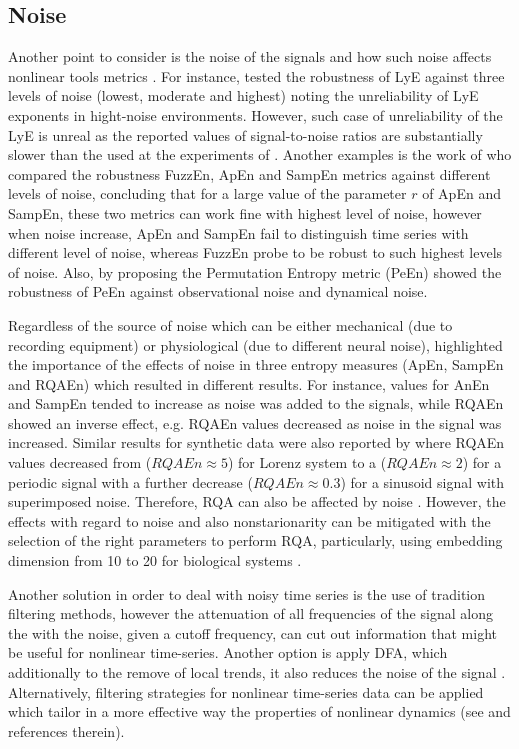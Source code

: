 \subsection{Noise}
Another point to consider is the noise of the signals
and how such noise affects nonlinear tools metrics \citep{caballero2014}.
For instance, \cite{rosenstein1993} tested the robustness of LyE against 
three levels of noise (lowest, moderate and highest) noting the unreliability 
of LyE exponents in hight-noise environments.
However, such case of unreliability of the LyE is unreal as the reported 
values of signal-to-noise ratios are substantially slower than the used at 
the experiments of \cite{rosenstein1993}.
Another examples is the work of \cite{chen2009} who compared the 
robustness FuzzEn, ApEn and SampEn metrics against different levels of noise, 
concluding that for a large value of the parameter $r$ of ApEn and SampEn, 
these two metrics can work fine with highest level of noise, however
when noise increase, ApEn and SampEn fail to distinguish time series with 
different level of noise, whereas FuzzEn probe to be robust to such highest 
levels of noise.
Also, \cite{bandt2002} by proposing the Permutation Entropy metric (PeEn)
showed the robustness of PeEn against observational noise and dynamical noise.


Regardless of the source of noise which can be either mechanical 
(due to recording equipment) or physiological (due to different neural noise), 
\cite{rhea2011} highlighted the importance of the effects of noise in three 
entropy measures (ApEn, SampEn and RQAEn) which resulted in different results.
For instance, values for AnEn and SampEn tended to increase as noise was 
added to the signals, while RQAEn  showed an inverse effect, e.g. RQAEn 
values decreased as noise in the signal was increased.
Similar results for synthetic data were also reported by \cite{pellecchia2005} 
where RQAEn values decreased from ($RQAEn \approx 5$) for Lorenz system to a 
($RQAEn \approx 2$) for a periodic signal with a further decrease 
($RQAEn \approx 0.3$) for a sinusoid signal with superimposed noise. 
Therefore, RQA can also be affected by noise \citep{rhea2011}.
However, the effects with regard to noise and also nonstarionarity
can be mitigated with the selection of the right parameters to perform RQA,
particularly, using embedding dimension from 10 to 20 for biological systems 
\citep{webber2005}.

Another solution in order to deal with noisy time series is the use of 
tradition filtering methods, however the attenuation of all frequencies 
of the signal along the with the noise, given a cutoff frequency, can cut 
out information that might be useful for nonlinear time-series. 
Another option is apply DFA, which additionally to the remove of local 
trends, it also reduces the noise of the signal \citep{hausdorff1995}.
Alternatively, filtering strategies for nonlinear time-series data can 
be applied which tailor in a more effective way the properties of 
nonlinear dynamics (see \citealt*{bradley2015} and references therein).


